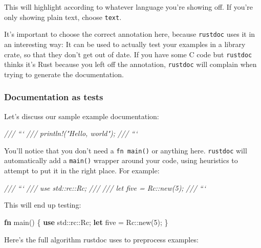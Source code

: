 \documentclass[a4paper,]{book}
\newenvironment{Shaded}{\begin{snugshade}}{\end{snugshade}}
\newcommand{\KeywordTok}[1]{\textcolor[rgb]{0.13,0.29,0.53}{\textbf{{#1}}}}
\newcommand{\DecValTok}[1]{\textcolor[rgb]{0.00,0.00,0.81}{{#1}}}
\newcommand{\CommentTok}[1]{\textcolor[rgb]{0.56,0.35,0.01}{\textit{{#1}}}}
\newcommand{\NormalTok}[1]{{#1}}
\begin{document}
This will highlight according to whatever language you're showing off.
If you're only showing plain text, choose \texttt{text}.

It's important to choose the correct annotation here, because
\texttt{rustdoc} uses it in an interesting way: It can be used to
actually test your examples in a library crate, so that they don't get
out of date. If you have some C code but \texttt{rustdoc} thinks it's
Rust because you left off the annotation, \texttt{rustdoc} will complain
when trying to generate the documentation.

\subsubsection{Documentation as tests}\label{documentation-as-tests}

Let's discuss our sample example documentation:

\begin{Shaded}
\begin{Highlighting}[]
\CommentTok{/// ```}
\CommentTok{/// println!("Hello, world");}
\CommentTok{/// ```}
\end{Highlighting}
\end{Shaded}

You'll notice that you don't need a \texttt{fn\ main()} or anything
here. \texttt{rustdoc} will automatically add a \texttt{main()} wrapper
around your code, using heuristics to attempt to put it in the right
place. For example:

\begin{Shaded}
\begin{Highlighting}[]
\CommentTok{/// ```}
\CommentTok{/// use std::rc::Rc;}
\CommentTok{///}
\CommentTok{/// let five = Rc::new(5);}
\CommentTok{/// ```}
\end{Highlighting}
\end{Shaded}

This will end up testing:

\begin{Shaded}
\begin{Highlighting}[]
\KeywordTok{fn} \NormalTok{main() \{}
    \KeywordTok{use} \NormalTok{std::rc::Rc;}
    \KeywordTok{let} \NormalTok{five = Rc::new(}\DecValTok{5}\NormalTok{);}
\NormalTok{\}}
\end{Highlighting}
\end{Shaded}

Here's the full algorithm rustdoc uses to preprocess examples:
\end{document}
